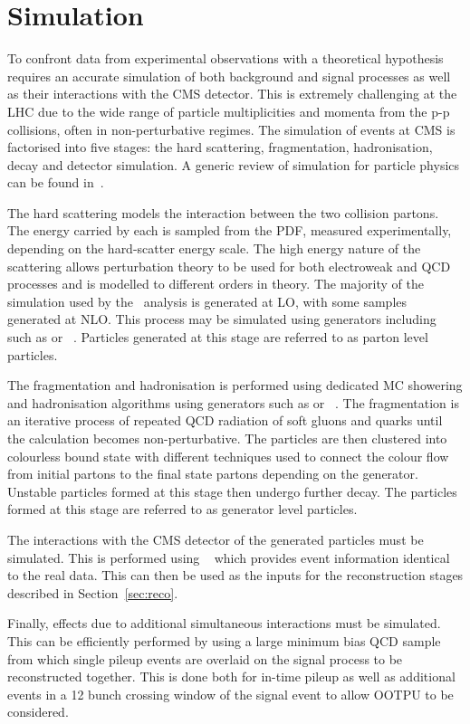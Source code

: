 \section{Simulation}

To confront data from experimental observations with a theoretical hypothesis requires an accurate
simulation of both background and signal processes as well as their interactions with the CMS detector.
This is extremely challenging at the LHC due to the wide range of particle multiplicities and momenta 
from the p-p collisions, often in non-perturbative regimes. The simulation of events at CMS 
is factorised into five stages: the hard scattering, fragmentation, hadronisation, decay and 
detector simulation. A generic review of simulation for particle physics can be found in~\cite{sim_rev}.

The hard scattering models the interaction between the two collision partons. The energy carried by each
is sampled from the PDF, measured experimentally, depending on the hard-scatter energy scale. 
The high energy nature of the scattering allows perturbation theory to be used for both electroweak and QCD processes
and is modelled to different orders in theory. The majority of the simulation used by the \alphat~analysis is generated at LO, with some 
samples generated at NLO. This process may be simulated using generators including such as \PYTHIA or \MADGRAPH~\cite{PYTHIA,MADGRAPH}. Particles
generated at this stage are referred to as parton level particles.

The fragmentation and hadronisation is performed using dedicated MC showering and hadronisation algorithms using
generators such as \PYTHIA or \HERWIG~\cite{PYTHIA,HERWIG}. The fragmentation is an iterative process of repeated QCD 
radiation of soft gluons and quarks until the calculation
becomes non-perturbative. The particles are then clustered into colourless bound state with different techniques used
to connect the colour flow from initial partons to the final state partons depending on the generator. Unstable particles
formed at this stage then undergo further decay. The particles formed at this stage are referred to as generator level 
particles.

The interactions with the CMS detector of the generated particles must be simulated. This is performed using \GEANTfour~\cite{GEANT} which provides
event information identical to the real data. This can then be used as the inputs for the reconstruction stages described 
in Section~\ref{sec:reco}.

Finally, effects due to additional simultaneous interactions must be simulated. This can be efficiently performed by using
a large minimum bias QCD sample from which single pileup events are overlaid on the signal process to be reconstructed 
together. This is done both for in-time pileup as well as additional events in a 12 bunch crossing window of the 
signal event to allow OOTPU to be considered.

